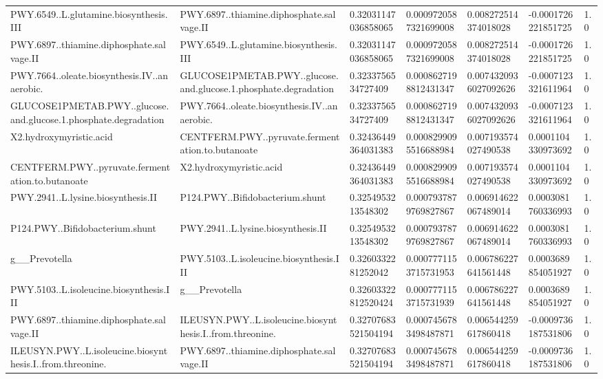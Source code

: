 \begin{longtable}{lllllll}
PWY.6549..L.glutamine.biosynthesis.III & PWY.6897..thiamine.diphosphate.salvage.II & 0.32031147036858065 & 0.0009720587321699008 & 0.008272514374018028 & -0.0001726221851725 & 1.0 \\
PWY.6897..thiamine.diphosphate.salvage.II & PWY.6549..L.glutamine.biosynthesis.III & 0.32031147036858065 & 0.0009720587321699008 & 0.008272514374018028 & -0.0001726221851725 & 1.0 \\
PWY.7664..oleate.biosynthesis.IV..anaerobic. & GLUCOSE1PMETAB.PWY..glucose.and.glucose.1.phosphate.degradation & 0.3233756534727409 & 0.0008627198812431347 & 0.0074320936027092626 & -0.0007123321611964 & 1.0 \\
GLUCOSE1PMETAB.PWY..glucose.and.glucose.1.phosphate.degradation & PWY.7664..oleate.biosynthesis.IV..anaerobic. & 0.3233756534727409 & 0.0008627198812431347 & 0.0074320936027092626 & -0.0007123321611964 & 1.0 \\
X2.hydroxymyristic.acid & CENTFERM.PWY..pyruvate.fermentation.to.butanoate & 0.32436449364031383 & 0.0008299095516688984 & 0.007193574027490538 & 0.0001104330973692 & 1.0 \\
CENTFERM.PWY..pyruvate.fermentation.to.butanoate & X2.hydroxymyristic.acid & 0.32436449364031383 & 0.0008299095516688984 & 0.007193574027490538 & 0.0001104330973692 & 1.0 \\
PWY.2941..L.lysine.biosynthesis.II & P124.PWY..Bifidobacterium.shunt & 0.3254953213548302 & 0.0007937879769827867 & 0.006914622067489014 & 0.0003081760336993 & 1.0 \\
P124.PWY..Bifidobacterium.shunt & PWY.2941..L.lysine.biosynthesis.II & 0.3254953213548302 & 0.0007937879769827867 & 0.006914622067489014 & 0.0003081760336993 & 1.0 \\
g\_\_Prevotella & PWY.5103..L.isoleucine.biosynthesis.III & 0.3260332281252042 & 0.0007771153715731953 & 0.006786227641561448 & 0.0003689854051927 & 1.0 \\
PWY.5103..L.isoleucine.biosynthesis.III & g\_\_Prevotella & 0.32603322812520424 & 0.0007771153715731939 & 0.006786227641561448 & 0.0003689854051927 & 1.0 \\
PWY.6897..thiamine.diphosphate.salvage.II & ILEUSYN.PWY..L.isoleucine.biosynthesis.I..from.threonine. & 0.32707683521504194 & 0.0007456783498487871 & 0.006544259617860418 & -0.0009736187531806 & 1.0 \\
ILEUSYN.PWY..L.isoleucine.biosynthesis.I..from.threonine. & PWY.6897..thiamine.diphosphate.salvage.II & 0.32707683521504194 & 0.0007456783498487871 & 0.006544259617860418 & -0.0009736187531806 & 1.0 \\

\end{longtable}
